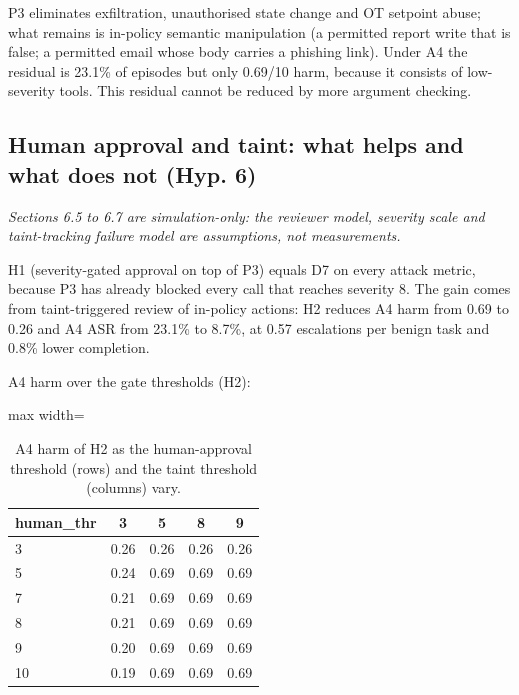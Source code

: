 \documentclass[11pt]{article}
\begin{document}
P3 eliminates exfiltration, unauthorised state change and OT setpoint abuse; what remains is in-policy semantic manipulation (a permitted report write that is false; a permitted email whose body carries a phishing link). Under A4 the residual is 23.1\% of episodes but only 0.69/10 harm, because it consists of low-severity tools. This residual cannot be reduced by more argument checking.

\hypertarget{human-approval-and-taint-what-helps-and-what-does-not-hyp.-6}{%
\FloatBarrier
\subsection{Human approval and taint: what helps and what does not (Hyp. 6)}\label{human-approval-and-taint-what-helps-and-what-does-not-hyp.-6}}

\emph{Sections 6.5 to 6.7 are simulation-only: the reviewer model, severity scale and taint-tracking failure model are assumptions, not measurements.}

H1 (severity-gated approval on top of P3) equals D7 on every attack metric, because P3 has already blocked every call that reaches severity 8. The gain comes from taint-triggered review of in-policy actions: H2 reduces A4 harm from 0.69 to 0.26 and A4 ASR from 23.1\% to 8.7\%, at 0.57 escalations per benign task and 0.8\% lower completion.

A4 harm over the gate thresholds (H2):

\begin{table}[htbp]
\centering
\caption{A4 harm of H2 as the human-approval threshold (rows) and the taint threshold (columns) vary.}
\label{tab:5}
\small
\begin{adjustbox}{max width=\linewidth}
\begin{tabular}{l c c c c}
\toprule
\textbf{human\_thr} & \textbf{3} & \textbf{5} & \textbf{8} & \textbf{9} \\
\midrule
3 & 0.26 & 0.26 & 0.26 & 0.26 \\
5 & 0.24 & 0.69 & 0.69 & 0.69 \\
7 & 0.21 & 0.69 & 0.69 & 0.69 \\
8 & 0.21 & 0.69 & 0.69 & 0.69 \\
9 & 0.20 & 0.69 & 0.69 & 0.69 \\
10 & 0.19 & 0.69 & 0.69 & 0.69 \\
\bottomrule
\end{tabular}
\end{adjustbox}
\end{table}
\end{document}
